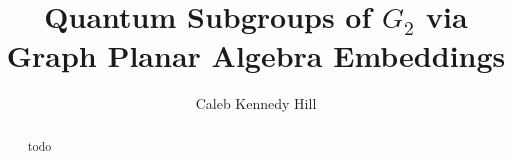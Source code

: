\documentclass{amsart}
\title{Quantum Subgroups of $G_2$ via Graph Planar Algebra Embeddings}
\author{Caleb Kennedy Hill}
\date{}
\begin{document}
\maketitle

\begin{abstract}
    todo
\end{abstract}





% 










\printbibliography
\end{document}
